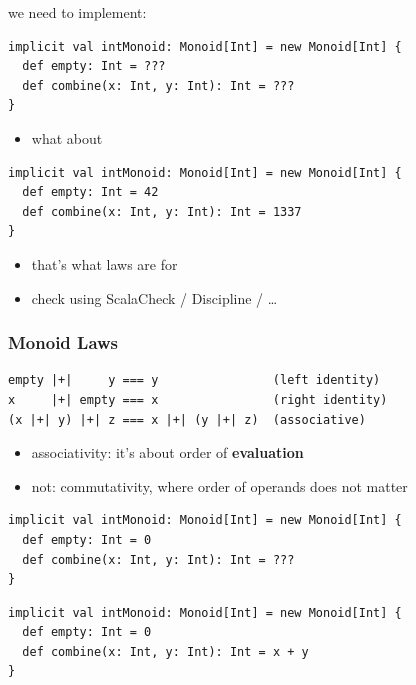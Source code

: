\documentclass[aspectratio=169]{beamer}
\begin{document}
\begin{frame}[fragile]
  we need to implement:
  \begin{verbatim}
implicit val intMonoid: Monoid[Int] = new Monoid[Int] {
  def empty: Int = ???
  def combine(x: Int, y: Int): Int = ???
}
  \end{verbatim}
\end{frame}

\begin{frame}
  \begin{itemize}
  \item  what about
  \end{itemize}
  \begin{verbatim}
implicit val intMonoid: Monoid[Int] = new Monoid[Int] {
  def empty: Int = 42
  def combine(x: Int, y: Int): Int = 1337
}
\end{verbatim}
\begin{itemize}
\item that's what laws are for
\item check using ScalaCheck / Discipline / \ldots{}
\end{itemize}
\end{frame}

\begin{frame}[fragile]
  \frametitle{Monoid Laws}
  \begin{verbatim}
empty |+|     y === y                (left identity)
x     |+| empty === x                (right identity)
(x |+| y) |+| z === x |+| (y |+| z)  (associative)
  \end{verbatim}
  \begin{itemize}
  \item associativity: it's about order of \textbf{evaluation}
  \item not: commutativity, where order of operands does not matter
  \end{itemize}
\end{frame}

\begin{frame}
  \begin{verbatim}
implicit val intMonoid: Monoid[Int] = new Monoid[Int] {
  def empty: Int = 0
  def combine(x: Int, y: Int): Int = ???
}
  \end{verbatim}
\end{frame}

\begin{frame}
  \begin{verbatim}
implicit val intMonoid: Monoid[Int] = new Monoid[Int] {
  def empty: Int = 0
  def combine(x: Int, y: Int): Int = x + y
}
  \end{verbatim}
\end{frame}
\end{document}
